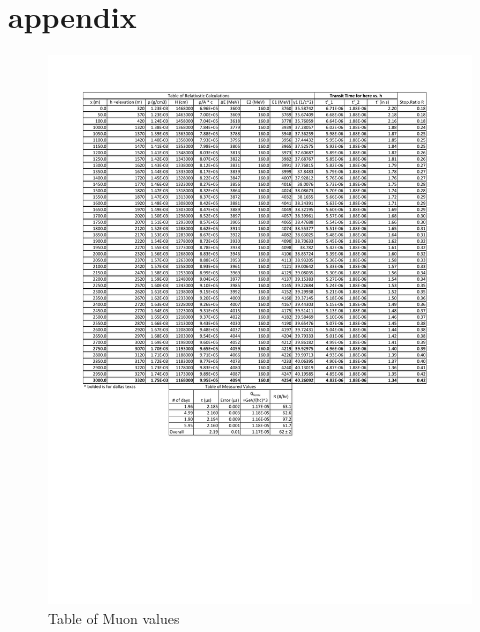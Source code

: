 \documentclass[12pt,twocolumn]{article}
\begin{document}
\section{appendix}
\begin{figure}
	\centering
	\label{fig:table of values}
	\includegraphics[width=6in]{images/Muon2}
	\caption{Table of Muon values}
\end{figure}
\end{document}
